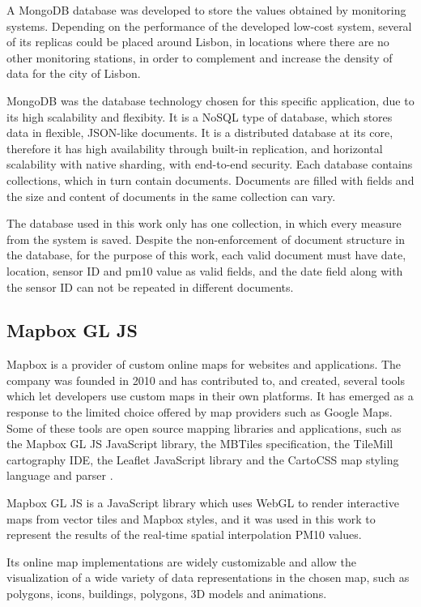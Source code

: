 A MongoDB database was developed to store the values obtained by monitoring systems. Depending on the performance of the developed low-cost system, several of its replicas could be placed around Lisbon, in locations where there are no other monitoring stations, in order to complement and increase the density of data for the city of Lisbon.

MongoDB was the database technology chosen for this specific application, due to its high scalability and flexibity. It is a NoSQL type of database, which stores data in flexible, JSON-like documents. It is a distributed database at its core, therefore it has high availability through built-in replication, and horizontal scalability with native sharding, with end-to-end security. Each database contains collections, which in turn contain documents. Documents are filled with fields and the size and content of documents in the same collection can vary.

The database used in this work only has one collection, in which every measure from the system is saved. Despite the non-enforcement of document structure in the database, for the purpose of this work, each valid document must have date, location, sensor ID and pm10 value as valid fields, and the date field along with the sensor ID can not be repeated in different documents.

\subsection{Mapbox GL JS}

Mapbox is a provider of custom online maps for websites and applications. The company was founded in 2010 and has contributed to, and created, several tools which let developers use custom maps in their own platforms. It has emerged as a response to the limited choice offered by map providers such as Google Maps. Some of these tools are open source mapping libraries and applications, such as the Mapbox GL JS JavaScript library, the MBTiles specification, the TileMill cartography IDE, the Leaflet JavaScript library and the CartoCSS map styling language and parser \cite{Mapbox2019}.

Mapbox GL JS is a JavaScript library which uses WebGL to render interactive maps from vector tiles and Mapbox styles, and it was used in this work to represent the results of the real-time spatial interpolation PM10 values.

Its online map implementations are widely customizable and allow the visualization of a wide variety of data representations in the chosen map, such as polygons, icons, buildings, polygons, 3D models and animations.

